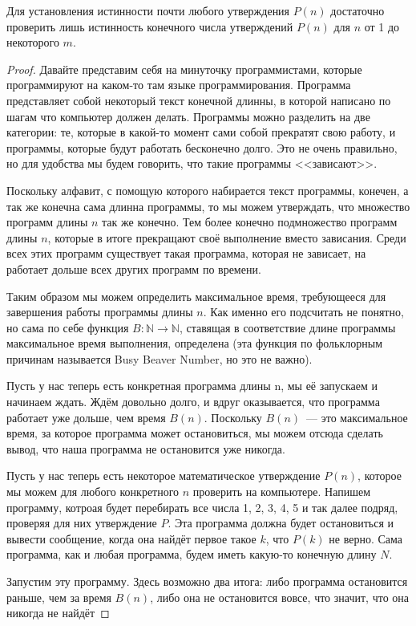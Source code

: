 \begin{thm}
Для установления истинности почти любого утверждения $P(n)$ достаточно проверить лишь истинность конечного числа утверждений $P(n)$ для $n$ от 1 до некоторого $m$.
\end{thm}
\begin{proof}
Давайте представим себя на минуточку программистами, которые программируют на каком-то там языке программирования. Программа представляет собой некоторый текст конечной длинны, в которой написано по шагам что компьютер должен делать. Программы можно разделить на две категории: те, которые в какой-то момент сами собой прекратят свою работу, и программы, которые будут работать бесконечно долго. Это не очень правильно, но для удобства мы будем говорить, что такие программы <<зависают>>.

Поскольку алфавит, с помощую которого набирается текст программы, конечен, а так же конечна сама длинна программы, то мы можем утверждать, что множество программ длины $n$ так же конечно. Тем более конечно подмножество программ длины $n$, которые в итоге прекращают своё выполнение вместо зависания. Среди всех этих программ существует такая программа, которая не зависает, на работает дольше всех других программ по времени.

Таким образом мы можем определить максимальное время, требующееся для завершения работы программы длины $n$. Как именно его подсчитать не понятно, но сама по себе функция $B:\mathbb{N}\to\mathbb{N}$, ставящая в соответствие длине программы максимальное время выполнения, определена (эта функция по фольклорным причинам называется Busy Beaver Number, но это не важно).

Пусть у нас теперь есть конкретная программа длины n, мы её запускаем и начинаем ждать. Ждём довольно долго, и вдруг оказывается, что программа работает уже дольше, чем время $B(n)$. Поскольку $B(n)$~--- это максимальное время, за которое программа может остановиться, мы можем отсюда сделать вывод, что наша программа не остановится уже никогда.

Пусть у нас теперь есть некоторое математическое утверждение $P(n)$, которое мы можем для любого конкретного $n$ проверить на компьютере. Напишем программу, котроая будет перебирать все числа 1, 2, 3, 4, 5 и так далее подряд, проверяя для них утверждение $P$. Эта программа должна будет остановиться и вывести сообщение, когда она найдёт первое такое $k$, что $P(k)$ не верно. Сама программа, как и любая программа, будем иметь какую-то конечную длину $N$.

Запустим эту программу. Здесь возможно два итога: либо программа остановится раньше, чем за время $B(n)$, либо она не остановится вовсе, что значит, что она никогда не найдёт 
\end{proof}